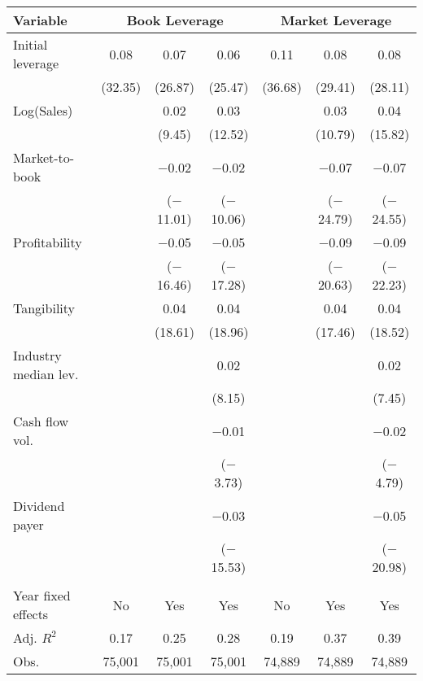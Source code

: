\begin{tabular}{l*{6}{c}}
\toprule
Variable & \multicolumn{3}{c}{Book Leverage} & \multicolumn{3}{c}{Market Leverage} \\ \midrule
Initial leverage&        0.08&        0.07&        0.06&        0.11&        0.08&        0.08\\
            &     (32.35)&     (26.87)&     (25.47)&     (36.68)&     (29.41)&     (28.11)\\
\addlinespace
Log(Sales)  &            &        0.02&        0.03&            &        0.03&        0.04\\
            &            &      (9.45)&     (12.52)&            &     (10.79)&     (15.82)\\
\addlinespace
Market-to-book&            &     $-$0.02&     $-$0.02&            &     $-$0.07&     $-$0.07\\
            &            &  ($-$11.01)&  ($-$10.06)&            &  ($-$24.79)&  ($-$24.55)\\
\addlinespace
Profitability&            &     $-$0.05&     $-$0.05&            &     $-$0.09&     $-$0.09\\
            &            &  ($-$16.46)&  ($-$17.28)&            &  ($-$20.63)&  ($-$22.23)\\
\addlinespace
Tangibility &            &        0.04&        0.04&            &        0.04&        0.04\\
            &            &     (18.61)&     (18.96)&            &     (17.46)&     (18.52)\\
\addlinespace
Industry median lev.&            &            &        0.02&            &            &        0.02\\
            &            &            &      (8.15)&            &            &      (7.45)\\
\addlinespace
Cash flow vol.&            &            &     $-$0.01&            &            &     $-$0.02\\
            &            &            &   ($-$3.73)&            &            &   ($-$4.79)\\
\addlinespace
Dividend payer&            &            &     $-$0.03&            &            &     $-$0.05\\
            &            &            &  ($-$15.53)&            &            &  ($-$20.98)\\
\\
Year fixed effects&          No&         Yes&         Yes&          No&         Yes&         Yes\\
Adj. $ R^2$ &        0.17&        0.25&        0.28&        0.19&        0.37&        0.39\\
Obs.        &      75,001&      75,001&      75,001&      74,889&      74,889&      74,889\\
\bottomrule
\end{tabular}
